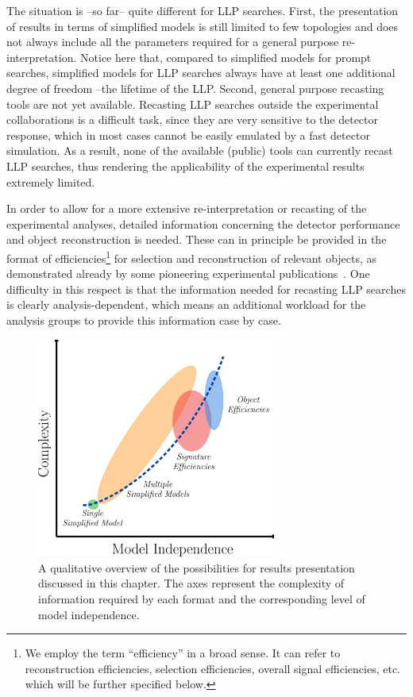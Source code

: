 The situation is --so far-- quite different for LLP searches. 
First, the presentation of results in terms of simplified models 
is still limited to few topologies and does not always include all the
parameters required for a general purpose re-interpretation. 
Notice here that, compared to simplified models for prompt searches, simplified models 
for LLP searches always have at least one additional degree of freedom --the lifetime of the LLP. 
Second, general purpose recasting tools are not yet available.
Recasting LLP searches outside the experimental collaborations is  a
difficult task, since they are very sensitive to the detector response, which in most cases 
cannot be easily emulated by a fast detector simulation.
As a result, none of the available (public) tools can currently recast
LLP searches, thus rendering the applicability of the experimental
results extremely limited. 

In order to allow for a more extensive re-interpretation or recasting of 
the experimental analyses, detailed information concerning the detector
performance and object reconstruction is needed.
These can in principle be provided in the format of efficiencies\footnote{We
employ the term ``efficiency'' in a broad sense. It can refer to reconstruction
efficiencies, selection efficiencies, overall signal efficiencies, etc. which will be further specified below.}
for selection and reconstruction of relevant objects, as demonstrated
already by some pioneering experimental publications~\cite{Khachatryan:2015lla,Aaboud:2017iio}.
One difficulty in this respect is that the information needed for recasting LLP searches is clearly
analysis-dependent, which means an additional workload for the analysis groups to provide this information 
case by case.  

\begin{figure}[t]
\begin{center}
\includegraphics[width=0.7\textwidth,angle=0]{ch5-figures/LLP_interpretationsB.png}
\end{center}
\caption{A qualitative overview of the possibilities
for results presentation discussed in this chapter.
The axes represent the complexity of information required by each
format and the corresponding level of model independence.}
\label{fig:ch5-complexity-vs-modelindependence}
\end{figure}

